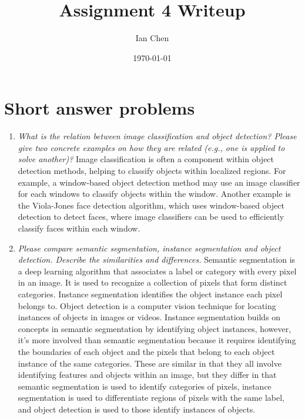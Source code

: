 \documentclass[11pt]{article}
\title{Assignment 4 Writeup}
\author{Ian Chen}
\date{\today}
\begin{document}
    \maketitle


    \section{Short answer problems}

    \begin{enumerate}
        \item \textit{What is the relation between image classification and object detection?
        Please give two concrete examples on how they are related (e.g., one is applied to solve another)?}
        Image classification is often a component within object detection methods, helping to classify objects
        within localized regions. For example, a window-based object detection method may use an image classifier for
        each windows to classify objects within the window. Another example is the Viola-Jones face detection
        algorithm, which uses window-based object detection to detect faces, where image classifiers can be used to
        efficiently classify faces within each window.

        \item \textit{Please compare semantic segmentation, instance segmentation and object detection.
        Describe the similarities and differences.}
        Semantic segmentation is a deep learning algorithm that associates a label or category with every pixel in an image.
        It is used to recognize a collection of pixels that form distinct categories.
        Instance segmentation identifies the object instance each pixel belongs to.
        Object detection is a computer vision technique for locating instances of objects in images or videos.
        Instance segmentation builds on concepts in semantic segmentation by identifying object instances, however,
        it's more involved than semantic segmentation because it requires identifying the boundaries of each object
        and the pixels that belong to each object instance of the same categories.
        These are similar in that they all involve identifying features and objects within an image, but they differ in
        that semantic segmentation is used to identify categories of pixels, instance segmentation is used to
        differentiate regions of pixels with the same label, and object detection is used to those identify instances
        of objects.


\end{enumerate}
\end{document}
